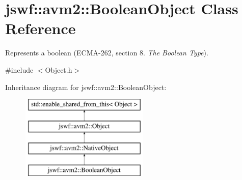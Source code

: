 \hypertarget{classjswf_1_1avm2_1_1_boolean_object}{\section{jswf\+:\+:avm2\+:\+:Boolean\+Object Class Reference}
\label{classjswf_1_1avm2_1_1_boolean_object}
}


Represents a boolean (E\+C\+M\+A-\/262, section 8. {\itshape The Boolean Type}).  




{\ttfamily \#include $<$Object.\+h$>$}

Inheritance diagram for jswf\+:\+:avm2\+:\+:Boolean\+Object\+:\begin{figure}[H]
\begin{center}
\leavevmode
\includegraphics[height=4.000000cm]{classjswf_1_1avm2_1_1_boolean_object}
\end{center}
\end{figure}
